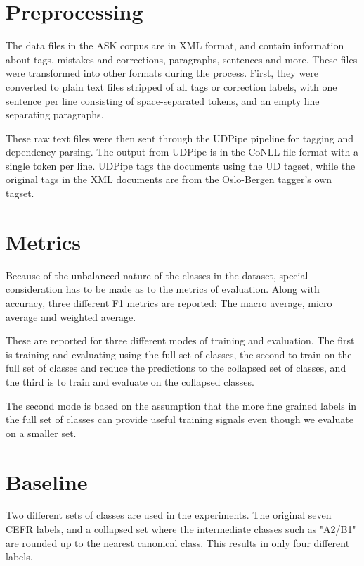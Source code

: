 
\section{Preprocessing}

The data files in the ASK corpus are in XML format, and contain information
about tags, mistakes and corrections, paragraphs, sentences and more. These
files were transformed into other formats during the process. First, they
were converted to plain text files stripped of all tags or correction labels,
with one sentence per line consisting of space-separated tokens, and an empty
line separating paragraphs.

These raw text files were then sent through the UDPipe pipeline for tagging
and dependency parsing. The output from UDPipe is in the CoNLL file format
with a single token per line. UDPipe tags the documents using the UD tagset,
while the original tags in the XML documents are from the Oslo-Bergen
tagger's own tagset.

\section{Metrics}

Because of the unbalanced nature of the classes in the dataset, special
consideration has to be made as to the metrics of evaluation. Along with
accuracy, three different F1 metrics are reported: The macro average, micro
average and weighted average.

These are reported for three different modes of training and evaluation. The
first is training and evaluating using the full set of classes, the second to
train on the full set of classes and reduce the predictions to the collapsed
set of classes, and the third is to train and evaluate on the collapsed
classes.

The second mode is based on the assumption that the more fine grained labels
in the full set of classes can provide useful training signals even though we
evaluate on a smaller set.

\section{Baseline}

Two different sets of classes are used in the experiments. The original seven
CEFR labels, and a collapsed set where the intermediate classes such as
"A2/B1" are rounded up to the nearest canonical class. This results in only
four different labels.

